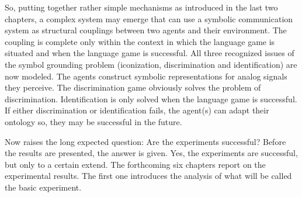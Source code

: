 So, putting together rather simple mechanisms as introduced in the last two chapters, a complex system may emerge that can use a symbolic communication system as structural couplings between two agents and their environment. The coupling is complete only within the context in which the language game is situated and when the language game is successful. All three recognized issues of the symbol grounding problem (iconization, discrimination and identification) are now modeled. The agents construct symbolic representations for analog signals they perceive. The discrimination game obviously solves the problem of discrimination. Identification is only solved when the language game is successful. If either discrimination or identification fails, the agent(s) can adapt their ontology so, they may be successful in the future.

\p
Now raises the long expected question: Are the experiments successful? Before the results are presented, the answer is given. Yes, the experiments are successful, but only to a certain extend. The forthcoming six chapters report on the experimental results. The first one introduces the analysis of what will be called the basic experiment.
